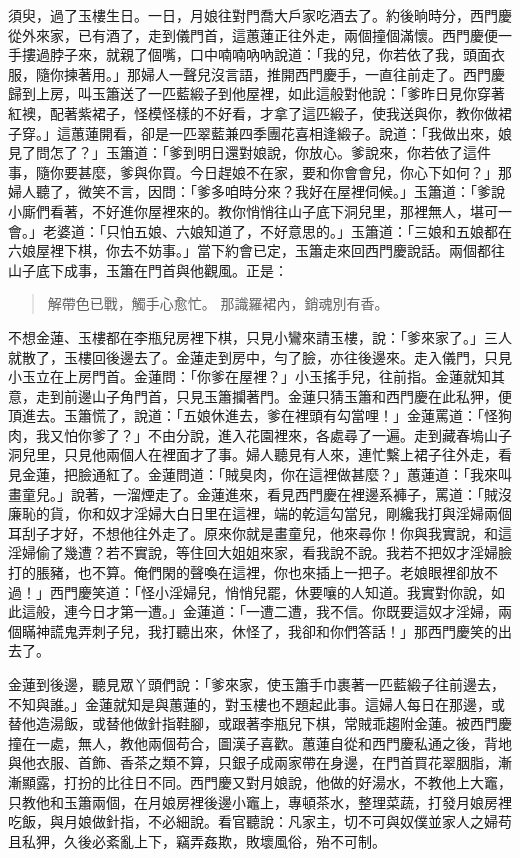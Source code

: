須臾，過了玉樓生日。一日，月娘往對門喬大戶家吃酒去了。約後晌時分，西門慶從外來家，已有酒了，走到儀門首，這蕙蓮正往外走，兩個撞個滿懷。西門慶便一手摟過脖子來，就親了個嘴，口中喃喃吶吶說道：「我的兒，你若依了我，頭面衣服，隨你揀著用。」那婦人一聲兒沒言語，推開西門慶手，一直往前走了。西門慶歸到上房，叫玉簫送了一匹藍緞子到他屋裡，如此這般對他說：「爹昨日見你穿著紅襖，配著紫裙子，怪模怪樣的不好看，才拿了這匹緞子，使我送與你，教你做裙子穿。」這蕙蓮開看，卻是一匹翠藍兼四季團花喜相逢緞子。說道：「我做出來，娘見了問怎了？」玉簫道：「爹到明日還對娘說，你放心。爹說來，你若依了這件事，隨你要甚麼，爹與你買。今日趕娘不在家，要和你會會兒，你心下如何？」那婦人聽了，微笑不言，因問：「爹多咱時分來？我好在屋裡伺候。」玉簫道：「爹說小廝們看著，不好進你屋裡來的。教你悄悄往山子底下洞兒里，那裡無人，堪可一會。」老婆道：「只怕五娘、六娘知道了，不好意思的。」玉簫道：「三娘和五娘都在六娘屋裡下棋，你去不妨事。」當下約會已定，玉簫走來回西門慶說話。兩個都往山子底下成事，玉簫在門首與他觀風。正是：
\begin{quote}
解帶色已戰，觸手心愈忙。
那識羅裙內，銷魂別有香。
\end{quote}

不想金蓮、玉樓都在李瓶兒房裡下棋，只見小鸞來請玉樓，說：「爹來家了。」三人就散了，玉樓回後邊去了。金蓮走到房中，勻了臉，亦往後邊來。走入儀門，只見小玉立在上房門首。金蓮問：「你爹在屋裡？」小玉搖手兒，往前指。金蓮就知其意，走到前邊山子角門首，只見玉簫攔著門。金蓮只猜玉簫和西門慶在此私狎，便頂進去。玉簫慌了，說道：「五娘休進去，爹在裡頭有勾當哩！」金蓮罵道：「怪狗肉，我又怕你爹了？」不由分說，進入花園裡來，各處尋了一遍。走到藏春塢山子洞兒里，只見他兩個人在裡面才了事。婦人聽見有人來，連忙繫上裙子往外走，看見金蓮，把臉通紅了。金蓮問道：「賊臭肉，你在這裡做甚麼？」蕙蓮道：「我來叫畫童兒。」說著，一溜煙走了。金蓮進來，看見西門慶在裡邊系褲子，罵道：「賊沒廉恥的貨，你和奴才淫婦大白日里在這裡，端的乾這勾當兒，剛纔我打與淫婦兩個耳刮子才好，不想他往外走了。原來你就是畫童兒，他來尋你！你與我實說，和這淫婦偷了幾遭？若不實說，等住回大姐姐來家，看我說不說。我若不把奴才淫婦臉打的脹豬，也不算。俺們閑的聲喚在這裡，你也來插上一把子。老娘眼裡卻放不過！」西門慶笑道：「怪小淫婦兒，悄悄兒罷，休要嚷的人知道。我實對你說，如此這般，連今日才第一遭。」金蓮道：「一遭二遭，我不信。你既要這奴才淫婦，兩個瞞神謊鬼弄刺子兒，我打聽出來，休怪了，我卻和你們答話！」那西門慶笑的出去了。

金蓮到後邊，聽見眾丫頭們說：「爹來家，使玉簫手巾裹著一匹藍緞子往前邊去，不知與誰。」金蓮就知是與蕙蓮的，對玉樓也不題起此事。這婦人每日在那邊，或替他造湯飯，或替他做針指鞋腳，或跟著李瓶兒下棋，常賊乖趨附金蓮。被西門慶撞在一處，無人，教他兩個苟合，圖漢子喜歡。蕙蓮自從和西門慶私通之後，背地與他衣服、首飾、香茶之類不算，只銀子成兩家帶在身邊，在門首買花翠胭脂，漸漸顯露，打扮的比往日不同。西門慶又對月娘說，他做的好湯水，不教他上大竈，只教他和玉簫兩個，在月娘房裡後邊小竈上，專頓茶水，整理菜蔬，打發月娘房裡吃飯，與月娘做針指，不必細說。看官聽說：凡家主，切不可與奴僕並家人之婦苟且私狎，久後必紊亂上下，竊弄姦欺，敗壞風俗，殆不可制。

